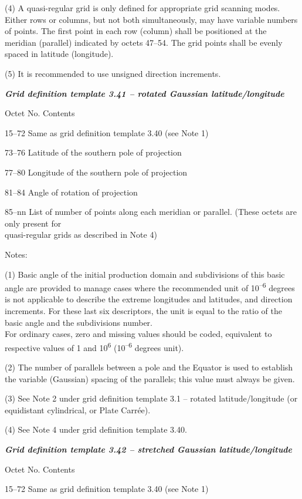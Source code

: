 (4) A quasi-regular grid is only defined for appropriate grid scanning modes. Either rows or columns, but not both simultaneously, may have variable numbers of points. The first point in each row (column) shall be positioned at the meridian (parallel) indicated by octets 47--54. The grid points shall be evenly spaced in latitude (longitude).

(5) It is recommended to use unsigned direction increments.

\emph{\textbf{Grid definition template 3.41 -- rotated Gaussian latitude/longitude}}

Octet No. Contents

15--72 Same as grid definition template 3.40 (see Note 1)

73--76 Latitude of the southern pole of projection

77--80 Longitude of the southern pole of projection

81--84 Angle of rotation of projection

85--nn List of number of points along each meridian or parallel. (These octets are only present for\\
quasi-regular grids as described in Note 4)

Notes:

(1) Basic angle of the initial production domain and subdivisions of this basic angle are provided to manage cases where the recommended unit of 10\textsuperscript{--6} degrees is not applicable to describe the extreme longitudes and latitudes, and direction increments. For these last six descriptors, the unit is equal to the ratio of the basic angle and the subdivisions number.\\
For ordinary cases, zero and missing values should be coded, equivalent to respective values of 1 and 10\textsuperscript{6} (10\textsuperscript{--6} degrees unit).

(2) The number of parallels between a pole and the Equator is used to establish the variable (Gaussian) spacing of the parallels; this value must always be given.

(3) See Note 2 under grid definition template 3.1 -- rotated latitude/longitude (or equidistant cylindrical, or Plate Carrée).

(4) See Note 4 under grid definition template 3.40.

\emph{\textbf{Grid definition template 3.42 -- stretched Gaussian latitude/longitude}}

Octet No. Contents

15--72 Same as grid definition template 3.40 (see Note 1)

